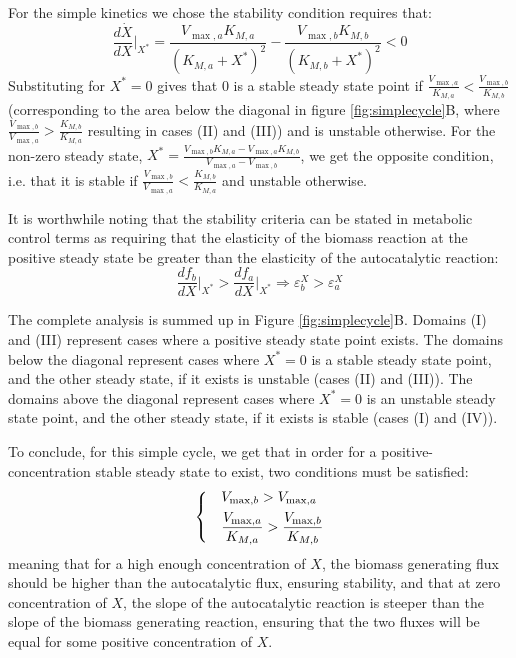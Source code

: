 \documentclass[a4page,notitlepage]{article}
\begin{document}
    For the simple kinetics we chose the stability condition requires that:
    \begin{equation*}
      \frac{d\dot X}{dX}\Big\vert_{X^*} = \frac{V_{\max,a}K_{M,a}}{(K_{M,a}+X^*)^2}-\frac{V_{\max,b}K_{M,b}}{(K_{M,b}+X^*)^2}<0
    \end{equation*}
    Substituting for $X^*=0$ gives that $0$ is a stable steady state point if $\frac{V_{\max,a}}{K_{M,a}}<\frac{V_{\max,b}}{K_{M,b}}$ (corresponding to the area below the diagonal in figure \ref{fig:simplecycle}B, where $\frac{V_{\max,b}}{V_{\max,a}}>\frac{K_{M,b}}{K_{M,a}}$ resulting in cases (II) and (III)) and is unstable otherwise.
    For  the non-zero steady state, $X^*=\frac{V_{\max,b}K_{M,a}-V_{\max,a}K_{M,b}}{V_{\max,a}-V_{\max,b}}$, we get the opposite condition, i.e. that it is stable if $\frac{V_{\max,b}}{V_{\max,a}}<\frac{K_{M,b}}{K_{M,a}}$ and unstable otherwise.

    It is worthwhile noting that the stability criteria can be stated in metabolic control terms \cite{Fell1997-bp} as requiring that the elasticity of the biomass reaction at the positive steady state be greater than the elasticity of the autocatalytic reaction:
    \begin{equation*}
      \frac{df_b}{dX}\Big\vert_{X^*}>\frac{df_a}{dX}\Big\vert_{X^*} \Rightarrow \varepsilon^X_b>\varepsilon^X_a
    \end{equation*}
    
    The complete analysis is summed up in Figure \ref{fig:simplecycle}B.
    Domains (I) and (III) represent cases where a positive steady state point exists.
    The domains below the diagonal represent cases where $X^*=0$ is a stable steady state point, and the other steady state, if it exists is unstable (cases (II) and (III)).
    The domains above the diagonal represent cases where $X^*=0$ is an unstable steady state point, and the other steady state, if it exists is stable (cases (I) and (IV)).

    To conclude, for this simple cycle, we get that in order for a positive-concentration stable steady state to exist, two conditions must be satisfied:
    \begin{equation}
    \label{eq:stabconds}
    \begin{dcases}
      & V_{\max,b}>V_{\max,a} \\
      & \frac{V_{\max,a}}{K_{M,a}}>\frac{V_{\max,b}}{K_{M,b}}
    \end{dcases}
    \end{equation}
    meaning that for a high enough concentration of $X$, the biomass generating flux should be higher than the autocatalytic flux, ensuring stability, and that at zero concentration of $X$, the slope of the autocatalytic reaction is steeper than the slope of the biomass generating reaction, ensuring that the two fluxes will be equal for some positive concentration of $X$.
\end{document}
